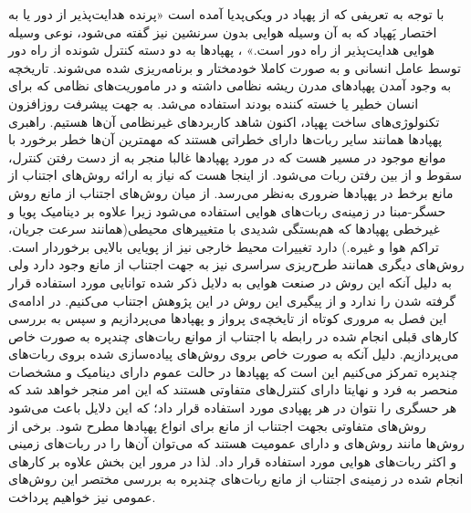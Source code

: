 با توجه به تعریفی که از پهپاد در ویکی‌پدیا آمده است «پرنده هدایت‌پذیر از دور یا به اختصار پَهپاد که به آن وسیله هوایی بدون سرنشین نیز گفته می‌شود، نوعی وسیله هوایی هدایت‌پذیر از راه دور است.» ، پهپادها به دو دسته کنترل شونده از راه دور توسط عامل انسانی و به صورت کاملا خودمختار و برنامه‌ریزی شده می‌شوند. تاریخچه به وجود آمدن پهپادهای مدرن ریشه نظامی داشته و در ماموریت‌های نظامی که برای انسان خطیر یا خسته کننده بودند استفاده می‌شد. به جهت پیشرفت روزافزون تکنولوژی‌های ساخت پهپاد، اکنون شاهد کاربردهای غیرنظامی آن‌ها هستیم. راهبری پهپادها همانند سایر ربات‌ها دارای خطراتی هستند که مهمترین آن‌ها خطر برخورد با موانع موجود در مسیر هست که در مورد پهپادها غالبا منجر به از دست رفتن کنترل، سقوط و از بین رفتن ربات می‌شود. از اینجا هست که نیاز به ارائه روش‌های اجتناب از مانع برخط در پهپادها ضروری به‌نظر می‌رسد. از میان روش‌های اجتناب از مانع روش حسگر-مبنا در زمینه‌ی ربات‌های هوایی استفاده می‌شود زیرا علاوه بر دینامیک پویا و غیرخطی پهپادها که هم‌بستگی شدیدی با متغییرهای محیطی(همانند سرعت جریان، تراکم هوا و غیره.) دارد تغییرات محیط خارجی نیز از پویایی بالایی برخوردار است. روش‌های دیگری همانند طرح‌ریزی سراسری نیز به جهت اجتناب از مانع وجود دارد ولی به دلیل آنکه این روش در صنعت هوایی به دلایل ذکر شده توانایی مورد استفاده قرار گرفته شدن را ندارد و از پیگیری این روش در این پژوهش اجتناب می‌کنیم.
در ادامه‌ی این فصل به مروری کوتاه از تایخچه‌ی پرواز و پهپادها می‌پردازیم و سپس به بررسی کارهای قبلی انجام شده در رابطه با اجتناب از موانع ربات‌های چندپره به صورت خاص می‌پردازیم. دلیل آنکه به صورت خاص بروی روش‌های پیاده‌سازی شده بروی ربات‌های چندپره تمرکز می‌کنیم این است که پهپادها در حالت عموم دارای دینامیک‌ و مشخصات منحصر به فرد و نهایتا دارای کنترل‌های متفاوتی هستند که این امر منجر خواهد شد که هر حسگری را نتوان در هر پهپادی مورد استفاده قرار داد؛ که این دلایل باعث می‌شود روش‌های متفاوتی بجهت اجتناب از مانع برای انواع پهپادها مطرح شود. برخی از روش‌ها مانند روش‌های  و  دارای عمومیت هستند که می‌توان آن‌ها را در ربات‌های زمینی و اکثر ربات‌های هوایی مورد استفاده قرار داد. لذا در مرور این بخش علاوه بر کارهای انجام شده در زمینه‌ی اجتناب از مانع ربات‌های چندپره به بررسی مختصر این روش‌های عمومی نیز خواهیم پرداخت.